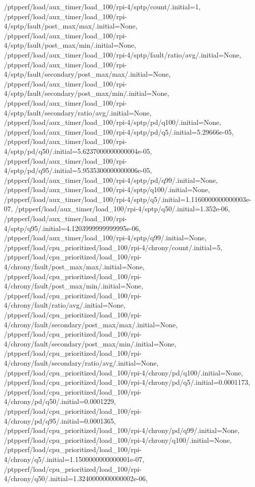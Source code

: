 {    /ptpperf/load/aux_timer/load_100/rpi-4/sptp/count/.initial=1,
    /ptpperf/load/aux_timer/load_100/rpi-4/sptp/fault/post_max/max/.initial=None,
    /ptpperf/load/aux_timer/load_100/rpi-4/sptp/fault/post_max/min/.initial=None,
    /ptpperf/load/aux_timer/load_100/rpi-4/sptp/fault/ratio/avg/.initial=None,
    /ptpperf/load/aux_timer/load_100/rpi-4/sptp/fault/secondary/post_max/max/.initial=None,
    /ptpperf/load/aux_timer/load_100/rpi-4/sptp/fault/secondary/post_max/min/.initial=None,
    /ptpperf/load/aux_timer/load_100/rpi-4/sptp/fault/secondary/ratio/avg/.initial=None,
    /ptpperf/load/aux_timer/load_100/rpi-4/sptp/pd/q100/.initial=None,
    /ptpperf/load/aux_timer/load_100/rpi-4/sptp/pd/q5/.initial=5.29666e-05,
    /ptpperf/load/aux_timer/load_100/rpi-4/sptp/pd/q50/.initial=5.6237000000000004e-05,
    /ptpperf/load/aux_timer/load_100/rpi-4/sptp/pd/q95/.initial=5.9535300000000006e-05,
    /ptpperf/load/aux_timer/load_100/rpi-4/sptp/pd/q99/.initial=None,
    /ptpperf/load/aux_timer/load_100/rpi-4/sptp/q100/.initial=None,
    /ptpperf/load/aux_timer/load_100/rpi-4/sptp/q5/.initial=1.1160000000000003e-07,
    /ptpperf/load/aux_timer/load_100/rpi-4/sptp/q50/.initial=1.352e-06,
    /ptpperf/load/aux_timer/load_100/rpi-4/sptp/q95/.initial=4.1203999999999995e-06,
    /ptpperf/load/aux_timer/load_100/rpi-4/sptp/q99/.initial=None,
    /ptpperf/load/cpu_prioritized/load_100/rpi-4/chrony/count/.initial=5,
    /ptpperf/load/cpu_prioritized/load_100/rpi-4/chrony/fault/post_max/max/.initial=None,
    /ptpperf/load/cpu_prioritized/load_100/rpi-4/chrony/fault/post_max/min/.initial=None,
    /ptpperf/load/cpu_prioritized/load_100/rpi-4/chrony/fault/ratio/avg/.initial=None,
    /ptpperf/load/cpu_prioritized/load_100/rpi-4/chrony/fault/secondary/post_max/max/.initial=None,
    /ptpperf/load/cpu_prioritized/load_100/rpi-4/chrony/fault/secondary/post_max/min/.initial=None,
    /ptpperf/load/cpu_prioritized/load_100/rpi-4/chrony/fault/secondary/ratio/avg/.initial=None,
    /ptpperf/load/cpu_prioritized/load_100/rpi-4/chrony/pd/q100/.initial=None,
    /ptpperf/load/cpu_prioritized/load_100/rpi-4/chrony/pd/q5/.initial=0.0001173,
    /ptpperf/load/cpu_prioritized/load_100/rpi-4/chrony/pd/q50/.initial=0.0001229,
    /ptpperf/load/cpu_prioritized/load_100/rpi-4/chrony/pd/q95/.initial=0.0001365,
    /ptpperf/load/cpu_prioritized/load_100/rpi-4/chrony/pd/q99/.initial=None,
    /ptpperf/load/cpu_prioritized/load_100/rpi-4/chrony/q100/.initial=None,
    /ptpperf/load/cpu_prioritized/load_100/rpi-4/chrony/q5/.initial=1.1500000000000001e-07,
    /ptpperf/load/cpu_prioritized/load_100/rpi-4/chrony/q50/.initial=1.3240000000000002e-06,
}
